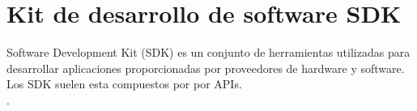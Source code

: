 \section{Kit de desarrollo de software SDK}

Software Development Kit (SDK) es un conjunto de herramientas utilizadas para desarrollar aplicaciones proporcionadas por proveedores de hardware y software. Los SDK suelen esta compuestos por por APIs.
\\.\par 
